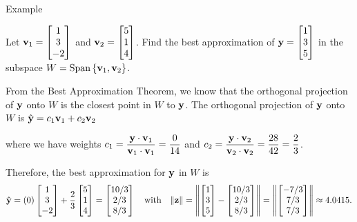 \documentclass[xcolor=dvipsnames,aspectratio=169,t]{beamer}
\begin{document}
\begin{frame}{Example}
  \smallskip
  
  Let $\mathbf{v}_1  = \begin{bmatrix} 1 \\ 3 \\ -2 \end{bmatrix}$ and 
  $\mathbf{v}_2 = \begin{bmatrix} 5 \\ 1 \\ 4 \end{bmatrix}$. 
  Find the \alert{best approximation} of $\mathbf{y} = \begin{bmatrix} 1 \\ 3 \\ 5 \end{bmatrix}$ in the subspace $W = \mbox{Span} \left\{ \mathbf{v}_1, \mathbf{v}_2 \right\}$.

  \bs

  \pause
  From the \alert{Best Approximation Theorem}, we know that the orthogonal projection of $\mathbf{y}$ onto $W$ is the closest point in $W$ to $\mathbf{y}$. The orthogonal projection of $\mathbf{y}$ onto $W$ is $\hat{\mathbf{y}} = c_1 \mathbf{v}_1 + c_2 \mathbf{v}_2$
  \smallskip
  
  where we have weights 
  {\small
  $c_1 = \displaystyle\frac{\mathbf{y} \cdot \mathbf{v}_1}{\mathbf{v}_1 \cdot \mathbf{v}_1} =  \frac{0}{14}$ and 
  $c_2 = \displaystyle\frac{\mathbf{y} \cdot \mathbf{v}_2}{\mathbf{v}_2 \cdot \mathbf{v}_2} = \frac{28}{42}=\frac{2}{3}$.
  }
  \bigskip

  Therefore, the best approximation for $\mathbf{y}$ in $W$ is
  \[ \hat{\mathbf{y}} = (0) \begin{bmatrix} 1 \\ 3 \\ -2 \end{bmatrix} + \frac{2}{3} \begin{bmatrix} 5 \\ 1 \\ 4 \end{bmatrix} =  \begin{bmatrix} 10/3 \\ 2/3 \\ 8/3 \end{bmatrix} \quad \mbox{with} \quad 
  \|  \mathbf{z} \| = \left\| \begin{bmatrix} 1 \\ 3 \\ 5 \end{bmatrix} - \begin{bmatrix} 10/3 \\ 2/3 \\ 8/3 \end{bmatrix} \right\| = \left\| \begin{bmatrix} -7/3 \\ 7/3 \\ 7/3 \end{bmatrix} \right\| \approx 4.0415. \]
\end{frame}
\end{document}
